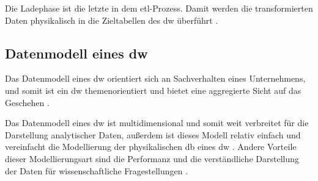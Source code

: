 Die Ladephase ist die letzte in dem \ac{etl}-Prozess. Damit werden die transformierten Daten physikalisch in die Zieltabellen des \ac{dw} überführt \cite{dwgoeken, dwtool}.

\subsection{Datenmodell eines \acs{dw}} \label{subsec:datamodel}

Das Datenmodell eines \ac{dw} orientiert sich an Sachverhalten eines Unternehmens, und somit ist ein \ac{dw} themenorientiert und bietet eine aggregierte Sicht auf das Geschehen \cite{dwgoeken}.

Das Datenmodell eines \ac{dw} ist multidimensional und somit weit verbreitet für die Darstellung analytischer Daten, außerdem ist dieses Modell relativ einfach und vereinfacht die Modellierung der physikalischen \ac{db} eines \ac{dw} \cite{dwbauer}. Andere Vorteile dieser Modellierungsart sind die Performanz und die verständliche Darstellung der Daten für wissenschaftliche Fragestellungen \cite{dwtool}.

